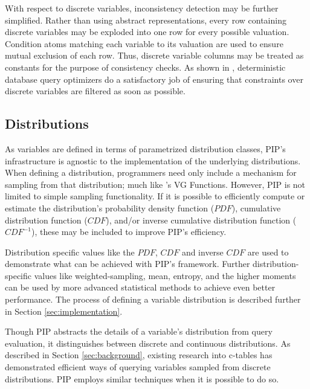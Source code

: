 With  respect to discrete variables, inconsistency detection may be further simplified.  Rather than using abstract representations, every row containing discrete variables may be exploded into one row for every possible valuation.  Condition atoms matching each variable to its
valuation are used to ensure mutual exclusion of each row.  Thus, discrete variable columns may be treated as constants for the purpose
of consistency checks.  As shown in \cite{AJKO2008}, deterministic database query optimizers do a satisfactory job of ensuring that constraints over discrete variables are filtered as soon as possible.

\subsection{Distributions}
As variables are defined in terms of parametrized distribution classes, PIP's infrastructure is agnostic to the implementation of the underlying distributions.  When defining a distribution, programmers need only include a mechanism for sampling from that distribution; much like \cite{MCDB}'s VG Functions.  However, PIP is not limited to simple sampling functionality.  If it is possible to efficiently compute or estimate the distribution's probability density function ($PDF$), cumulative distribution function ($CDF$), and/or inverse cumulative distribution function ($CDF^{-1}$), these may be included to improve PIP's efficiency.  

Distribution specific values like the $PDF$, $CDF$ and inverse $CDF$ are used to demonstrate what can be achieved with PIP's framework.  Further distribution-specific values like weighted-sampling, mean, entropy, and the higher moments can be used by more advanced statistical methods to achieve even better performance.  The process of defining a variable distribution is described further in Section \ref{sec:implementation}.  

Though PIP abstracts the details of a variable's distribution from query evaluation, it distinguishes between discrete and continuous distributions.  As described in Section \ref{sec:background}, existing research into c-tables has demonstrated efficient ways of querying variables sampled from discrete distributions.  PIP employs similar techniques when it is possible to do so.

